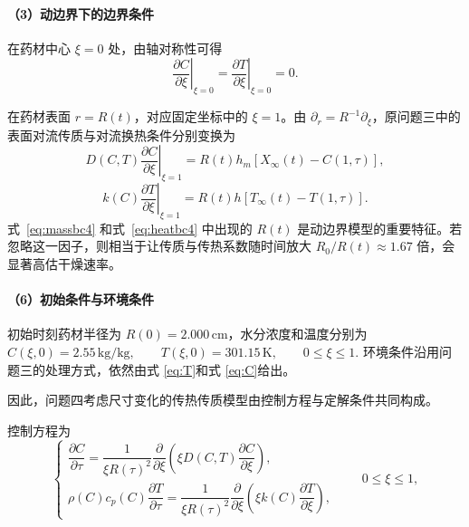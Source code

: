 \documentclass[12pt,a4paper]{article}
\begin{document}
\paragraph{（3）动边界下的边界条件}

在药材中心 \(\xi=0\) 处，由轴对称性可得
\begin{equation}
\left.
\frac{\partial C}{\partial\xi}
\right|_{\xi=0}
=
\left.
\frac{\partial T}{\partial\xi}
\right|_{\xi=0}
=
0.
\label{eq:center4}
\end{equation}

在药材表面 \(r=R(t)\)，对应固定坐标中的 \(\xi=1\)。由 \(\partial_r=R^{-1}\partial_\xi\)，原问题三中的表面对流传质与对流换热条件分别变换为
\begin{equation}
{
D(C,T)
\left.
\frac{\partial C}{\partial\xi}
\right|_{\xi=1}
=
R(t)h_m
\left[
X_\infty(t)-C(1,\tau)
\right]
},
\label{eq:massbc4}
\end{equation}
\begin{equation}
{
k(C)
\left.
\frac{\partial T}{\partial\xi}
\right|_{\xi=1}
=
R(t)h
\left[
T_\infty(t)-T(1,\tau)
\right]
}.
\label{eq:heatbc4}
\end{equation}
式~\eqref{eq:massbc4} 和式~\eqref{eq:heatbc4} 中出现的 \(R(t)\) 是动边界模型的重要特征。若忽略这一因子，则相当于让传质与传热系数随时间放大 \(R_0/R(t)\approx1.67\) 倍，会显著高估干燥速率。

\paragraph{（6）初始条件与环境条件}

初始时刻药材半径为 \(R(0)=2.000\,\mathrm{cm}\)，水分浓度和温度分别为
$C(\xi,0)=2.55\,\mathrm{kg/kg},
\qquad
T(\xi,0)=301.15\,\mathrm{K},
\qquad
0\le\xi\le1.
\label{eq:init4}$
环境条件沿用问题三的处理方式，依然由式 \eqref{eq:T}和式 \eqref{eq:C}给出。

因此，问题四考虑尺寸变化的传热传质模型由控制方程与定解条件共同构成。

控制方程为
\begin{equation}
\begin{cases}
\dfrac{\partial C}{\partial\tau}
=
\dfrac{1}{\xi R(\tau)^2}\dfrac{\partial}{\partial\xi}
\left(\xi D(C,T)\dfrac{\partial C}{\partial\xi}\right),\\[3mm]
\rho(C)c_p(C)\dfrac{\partial T}{\partial\tau}
=
\dfrac{1}{\xi R(\tau)^2}\dfrac{\partial}{\partial\xi}
\left(\xi k(C)\dfrac{\partial T}{\partial\xi}\right),
\end{cases}
\qquad 0\le\xi\le1,
\label{eq:model4_pde}
\end{equation}
\end{document}
